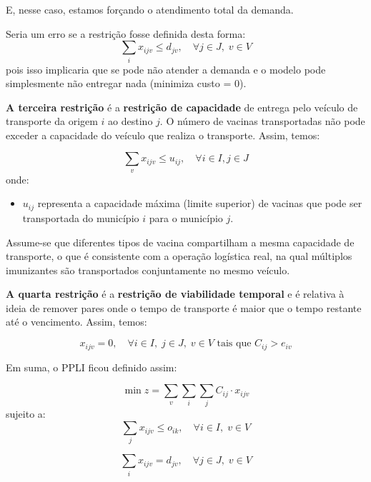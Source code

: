 E, nesse caso, estamos forçando o atendimento total da demanda.

Seria um erro se a restrição fosse definida desta forma:
\begin{equation*}
    \sum_{i} x_{ijv} \le d_{jv}, \quad \forall j \in J, \; v \in V
\end{equation*}
pois isso implicaria que se pode não atender a demanda e o modelo pode simplesmente não entregar nada (minimiza custo = 0).

\textbf{A terceira restrição} é a \textbf{restrição de capacidade} de entrega pelo veículo de transporte da origem $i$ ao destino $j$. 
O número de vacinas transportadas não pode exceder a capacidade do veículo que realiza o transporte. Assim, temos:

\begin{equation*}
    \sum_{v} x_{ijv} \le u_{ij}, \quad \forall i \in I, j \in J
\end{equation*}
onde:
\begin{itemize}
    \item $u_{ij}$ representa a capacidade máxima (limite superior) de vacinas que pode ser transportada do município $i$ para o município $j$.
\end{itemize}

Assume-se que diferentes tipos de vacina compartilham a mesma capacidade de transporte, o que é consistente com a operação logística real, na qual múltiplos imunizantes são transportados conjuntamente no mesmo veículo.

\textbf{A quarta restrição} é a \textbf{restrição de viabilidade temporal} e é relativa à ideia de remover pares onde o tempo de transporte é maior que o tempo restante até o vencimento. Assim, temos:

\begin{equation*}
x_{ijv} = 0, \quad \forall i \in I, \; j \in J, \; v \in V \text{ tais que } C_{ij} > e_{iv}
\end{equation*}

Em suma, o PPLI ficou definido assim:

\begin{equation*}
    \min z = \sum_{v} \sum_{i} \sum_{j} C_{ij} \cdot x_{ijv}
\end{equation*}
sujeito a:
\begin{equation*}
    \sum_{j} x_{ijv} \le o_{ik}, \quad \forall i \in I, \; v \in V
\end{equation*}

\begin{equation*}
    \sum_{i} x_{ijv} = d_{jv}, \quad \forall j \in J, \; v \in V
\end{equation*}

